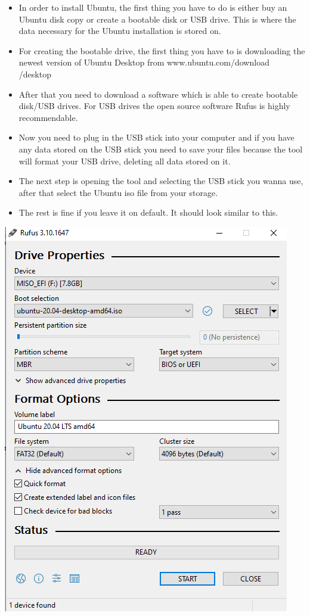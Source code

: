 \documentclass[a4paper,10pt]{article}
\begin{document}
\begin{itemize}[leftmargin=*]
\item In order to install Ubuntu, the first thing you have to do is either buy an Ubuntu disk copy or create a bootable disk or USB drive. This is where the data necessary for the Ubuntu installation is stored on.
\item For creating the bootable drive, the first thing you have to is downloading the newest version of Ubuntu Desktop from www.ubuntu.com/download\\/desktop
\item After that you need to download a software which is able to create bootable disk/USB drives. For USB drives the open source software Rufus is highly recommendable.
\item Now you need to plug in the USB stick into your computer and if you have any data stored on the USB stick you need to save your files because the tool will format your USB drive, deleting all data stored on it. 
\item The next step is opening the tool and selecting the USB stick you wanna use, after that select the Ubuntu iso file from your storage.
\item The rest is fine if you leave it on default. It should look similar to this.

\end{itemize}
\begin{center}
\includegraphics[scale=0.5]{Rufus ubuntu}
\end{center}
\end{document}
